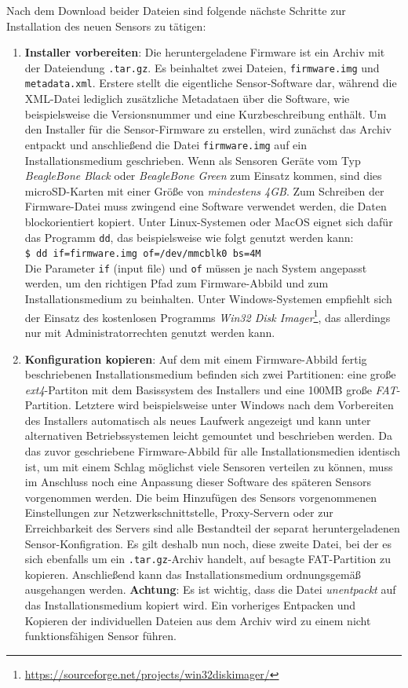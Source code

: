 \documentclass[12pt]{article}
\begin{document}
Nach dem Download beider Dateien sind folgende nächste Schritte zur Installation des neuen Sensors zu tätigen:
\begin{enumerate}
				\item \textbf{Installer vorbereiten}: Die heruntergeladene Firmware ist ein Archiv mit der Dateiendung \verb|.tar.gz|. Es beinhaltet zwei Dateien, \verb|firmware.img| und \verb|metadata.xml|. Erstere stellt die eigentliche Sensor-Software dar, während die XML-Datei lediglich zusätzliche Metadataen über die Software, wie beispielsweise die Versionsnummer und eine Kurzbeschreibung enthält. Um den Installer für die Sensor-Firmware zu erstellen, wird zunächst das Archiv entpackt und anschließend die Datei \verb|firmware.img| auf ein Installationsmedium geschrieben. Wenn als Sensoren Geräte vom Typ \textit{BeagleBone Black} oder \textit{BeagleBone Green} zum Einsatz kommen, sind dies microSD-Karten mit einer Größe von \textit{mindestens 4GB}. Zum Schreiben der Firmware-Datei muss zwingend eine Software verwendet werden, die Daten blockorientiert kopiert. Unter Linux-Systemen oder MacOS eignet sich dafür das Programm \verb|dd|, das beispielsweise wie folgt genutzt werden kann:\\
								\verb|$ dd if=firmware.img of=/dev/mmcblk0 bs=4M|\\
								Die Parameter \verb|if| (input file) und \verb|of| müssen je nach System angepasst werden, um den richtigen Pfad zum Firmware-Abbild und zum Installationsmedium zu beinhalten. Unter Windows-Systemen empfiehlt sich der Einsatz des kostenlosen Programms \textit{Win32 Disk Imager}\footnote{\url{https://sourceforge.net/projects/win32diskimager/}}, das allerdings nur mit Administratorrechten genutzt werden kann.
				\item \textbf{Konfiguration kopieren}: Auf dem mit einem Firmware-Abbild fertig beschriebenen Installationsmedium befinden sich zwei Partitionen: eine große \textit{ext4}-Partiton mit dem Basissystem des Installers und eine 100MB große \textit{FAT}-Partition. Letztere wird beispielsweise unter Windows nach dem Vorbereiten des Installers automatisch als neues Laufwerk angezeigt und kann unter alternativen Betriebssystemen leicht gemountet und beschrieben werden. Da das zuvor geschriebene Firmware-Abbild für alle Installationsmedien identisch ist, um mit einem Schlag möglichst viele Sensoren verteilen zu können, muss im Anschluss noch eine Anpassung dieser Software des späteren Sensors vorgenommen werden. Die beim Hinzufügen des Sensors vorgenommenen Einstellungen zur Netzwerkschnittstelle, Proxy-Servern oder zur Erreichbarkeit des Servers sind alle Bestandteil der separat heruntergeladenen Sensor-Konfigration. Es gilt deshalb nun noch, diese zweite Datei, bei der es sich ebenfalls um ein \verb|.tar.gz|-Archiv handelt, auf besagte FAT-Partition zu kopieren. Anschließend kann das Installationsmedium ordnungsgemäß ausgehangen werden. \textbf{Achtung}: Es ist wichtig, dass die Datei \textit{unentpackt} auf das Installationsmedium kopiert wird. Ein vorheriges Entpacken und Kopieren der individuellen Dateien aus dem Archiv wird zu einem nicht funktionsfähigen Sensor führen.

\end{enumerate}
\end{document}
